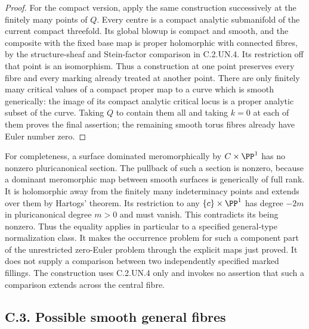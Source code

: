 \begin{proof}
For the compact version, apply the same construction successively
at the finitely many points of $Q$. Every centre is a compact
analytic submanifold of the current compact threefold. Its global
blowup is compact and smooth, and the composite with the fixed base
map is proper holomorphic with connected fibres, by the
structure-sheaf and Stein-factor comparison in C.2.UN.4. Its
restriction off that point is an isomorphism. Thus a construction
at one point preserves every fibre and every marking already
treated at another point. There are only finitely many critical
values of a compact proper map to a curve which is smooth
generically: the image of its compact analytic critical locus is
a proper analytic subset of the curve. Taking $Q$ to contain them
all and taking $k=0$ at each of them proves the final assertion;
the remaining smooth torus fibres already have Euler number zero.
\end{proof}

For completeness, a surface dominated meromorphically by
$C\times\PP^1$ has no nonzero pluricanonical section. The pullback
of such a section is nonzero, because a dominant meromorphic map
between smooth surfaces is generically of full rank. It is
holomorphic away from the finitely many indeterminacy points and
extends over them by Hartogs' theorem. Its restriction to any
$\{c\}\times\PP^1$ has degree $-2m$ in pluricanonical degree $m>0$
and must vanish. This contradicts its being nonzero. Thus the
equality applies in particular to a specified general-type
normalization class. It makes the occurrence problem for such a
component part of the unrestricted zero-Euler problem through the
explicit maps just proved. It does not supply a comparison between
two independently specified marked fillings. The construction
uses C.2.UN.4 only and invokes no assertion that such a comparison
extends across the central fibre.


\subsection{C.3. Possible smooth general fibres}


